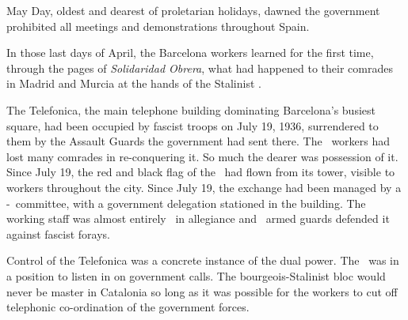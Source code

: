 May Day, oldest and dearest of proletarian holidays, dawned the government prohibited all meetings and demonstrations throughout Spain.

In those last days of April, the Barcelona workers learned for the first time, through the pages of \emph{Solidaridad Obrera}, what had happened to their comrades in Madrid and Murcia at the hands of the Stalinist \GPU.

\dinkus

The Telefonica, the main telephone building dominating Bar\-ce\-lo\-na’s busiest square, had been occupied by fascist troops on July 19, 1936, surrendered to them by the Assault Guards the government had sent there. The \CNT\ workers had lost many comrades in re-conquering it. So much the dearer was possession of it. Since July 19, the red and black flag of the \CNT\ had flown from its tower, visible to workers throughout the city. Since July 19, the exchange had been managed by a \CNT-\UGT\ committee, with a government delegation stationed in the building. The working staff was almost entirely \CNT\ in allegiance and \CNT\ armed guards defended it against fascist forays.

Control of the Telefonica was a concrete instance of the dual power. The \CNT\ was in a position to listen in on government calls. The bourgeois-Stalinist bloc would never be master in Catalonia so long as it was possible for the workers to cut off telephonic co-ordination of the government forces.


